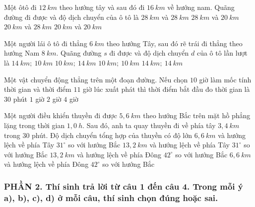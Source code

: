 \begin{ex}%
Một ôtô đi $12\ km$ theo hướng tây và sau đó đi $16\ km$ về hướng nam. Quãng đường đi được và độ dịch chuyển của ô tô là
\choice
{$28\ km$ và $28\ km$}
{\True $28\ km$ và $20\ km$}
{$20\ km$ và $28\ km$}
{$20\ km$ và $20\ km$}
\loigiai{
}
\end{ex}
\begin{ex}%
Một người lái ô tô đi thẳng $6\ km$ theo hướng Tây, sau đó rẽ trái đi thẳng theo hướng Nam $8\ km$. Quãng đường $s$ đi được và độ dịch chuyển $d$ của ô tô lần lượt là
\choice
{\True $14\ km;\ 10\ km$}
{$10\ km;\ 14\ km$}
{$10\ km;\ 10\ km$}
{$14\ km;\ 14\ km$}
\loigiai{
}
\end{ex}
\begin{ex}%
Một vật chuyển động thẳng trên một đoạn đường. Nếu chọn $10$ giờ làm mốc tính thời gian và thời điểm $11$ giờ lúc xuất phát thì thời điểm bắt đầu đo thời gian là
\choice
{$30$ phút}
{\True $1$ giờ}
{$2$ giờ}
{$4$ giờ}
\loigiai{

}
\end{ex}
\begin{ex}%
Một người điều khiển thuyền đi được $5,6\ km$ theo hướng Bắc trên mặt hồ phẳng lặng trong thời gian $1,0\ h$. Sau đó, anh ta quay thuyền đi về phía tây $3,4\ km$ trong $30$ phút. Độ dịch chuyển tổng hợp của thuyền có độ lớn
\choice
{\True $6,6\ km$ và hướng lệch về phía Tây $31^\circ$ so với hướng Bắc}
{$13,2\ km$ và hướng lệch về phía Tây $31^\circ$ so với hướng Bắc}
{$13,2\ km$ và hướng lệch về phía Đông $42^\circ$ so với hướng Bắc}
{$6,6\ km$ và hướng lệch về phía Đông $42^\circ$ so với hướng Bắc}
\loigiai{

}
\end{ex}











\subsubsection*{PHẦN 2. Thí sinh trả lời từ câu 1 đến câu 4. Trong mỗi ý a), b), c), d) ở mỗi câu, thí sinh chọn đúng hoặc sai.}
\setcounter{ex}{0}


